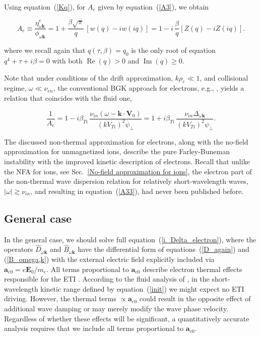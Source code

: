\documentclass[draft]{agujournal2019}
\renewcommand{\vec}{\mathbf}
\begin{document}
Using equation~(\ref{Kq}), for $A_{e}$ given by equation~(\ref{A3}), we obtain
\begin{linenomath*}
\begin{equation}
A_{e}\equiv\frac{\eta_{\omega\vec{k}}^{e}}{\phi_{\omega\vec{k}}}=1+\frac{\beta\sqrt{\pi}}{q}\,\left[  w(q)-iw(iq)\right]  =1-i\,\frac
{\beta}{q}\left[  Z(q)-iZ(iq)\right]  . 
\label{A33}
\end{equation}
\end{linenomath*}
where we recall again that $q(\tau,\beta) = q_{0}$ is the only root of equation~$q^{4}+\tau+i\beta=0$ 
with both $\operatorname{Re}(q)>0$ and $\operatorname{Im}(q)\geq0$. 

Note that under conditions of the drift approximation, $k\rho_{e}\ll1$, and
collisional regime, $\omega\ll\nu_{en}$, %
the conventional BGK approach for electrons, e.g., , yields a relation that
coincides with the fluid one,
\begin{linenomath*}
\[
\frac{1}{A_{e}}=1-i\beta_{Ti}\,\frac{\nu_{in}(\omega-\vec{k}\cdot
\vec{V}_{0})}{(kV_{Ti})^{2}\psi_\perp} = 1+i\beta_{Ti}\,\frac{\nu_{in}\Delta
_{\omega\mathbf{k}}}{(kV_{Ti})^{2}\psi_\perp}.
\]
\end{linenomath*}

The discussed non-thermal approximation for electrons, along with the no-field approximation for unmagnetized ions, 
describe the pure Farley-Buneman instability with the improved kinetic description of electrons. 
Recall that unlike the NFA for ions, see Sec.~\ref{No-field approximation for ions}, the electron 
part of the non-thermal wave dispersion relation for relatively short-wavelength 
waves, $|\omega|\gtrsim \nu_{in}$, and resulting in equation~(\ref{A33}), had never been published before.

\subsection{General case\label{General case}}

In the general case, we should solve full equation~(\ref{i_Delta_electron}), where the operators $\hat{D}_{\omega\vec
{k}}$ and $\hat{B}_{\omega\vec{k}}$ have the differential form of
equations~(\ref{D_again}) and (\ref{B_omega,k}) with the external electric field 
explicitly included via $\vec{a}_{e0}=e\vec{E}_0/m_e$. All terms proportional to
$\vec{a}_{e0}$ describe electron thermal effects responsible
for the ETI \cite{Dimant:Kinetic95b,Dimant:Physical97}. According to the fluid analysis of
, in the short-wavelength kinetic range
defined by equation~(\ref{init}) we might expect no ETI driving. However, the thermal
terms $\propto\vec{a}_{e0}$ could result in the opposite effect of additional
wave damping or may merely modify the wave phase velocity. 
Regardless of whether these effects will be significant,
a quantitatively accurate analysis requires that we include all terms proportional to $\vec{a}_{e0}$.
\end{document}
